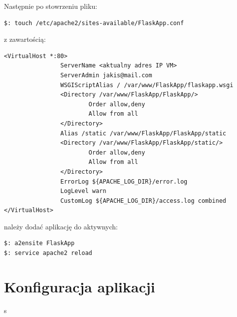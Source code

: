 \documentclass[12pt,a4paper]{article}
\begin{document}
Następnie po stowrzeniu pliku:
\begin{lstlisting}
$: touch /etc/apache2/sites-available/FlaskApp.conf
\end{lstlisting}

z zawartością:
\begin{lstlisting}
<VirtualHost *:80>
                ServerName <aktualny adres IP VM>
                ServerAdmin jakis@mail.com
                WSGIScriptAlias / /var/www/FlaskApp/flaskapp.wsgi
                <Directory /var/www/FlaskApp/FlaskApp/>
                        Order allow,deny
                        Allow from all
                </Directory>
                Alias /static /var/www/FlaskApp/FlaskApp/static
                <Directory /var/www/FlaskApp/FlaskApp/static/>
                        Order allow,deny
                        Allow from all
                </Directory>
                ErrorLog ${APACHE_LOG_DIR}/error.log
                LogLevel warn
                CustomLog ${APACHE_LOG_DIR}/access.log combined
</VirtualHost>
\end{lstlisting}     
 
należy dodać aplikację do aktywnych: 
\begin{lstlisting}
$: a2ensite FlaskApp
$: service apache2 reload
\end{lstlisting}
\newpage
\section{Konfiguracja aplikacji}
s
\end{document}
